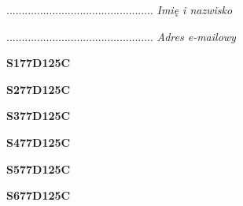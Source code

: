 \begin{turn}{90}\begin{minipage}{\linewidth} \vspace{20mm} ................................................  \textit{Imię i nazwisko}\end{minipage}\end{turn}

\begin{turn}{90}\begin{minipage}{\linewidth} \vspace{20mm} ................................................  \textit{Adres e-mailowy}\end{minipage}\end{turn}

\begin{turn}{90}\huge \begin{minipage}{\linewidth} \vspace{10mm}\textbf{S177D125C}\end{minipage}\end{turn}

\begin{turn}{90}\huge \begin{minipage}{\linewidth} \vspace{10mm}\textbf{S277D125C}\end{minipage}\end{turn}

\begin{turn}{90}\huge \begin{minipage}{\linewidth} \vspace{10mm}\textbf{S377D125C}\end{minipage}\end{turn}

\begin{turn}{90}\huge \begin{minipage}{\linewidth} \vspace{10mm}\textbf{S477D125C}\end{minipage}\end{turn}

\begin{turn}{90}\huge \begin{minipage}{\linewidth} \vspace{10mm}\textbf{S577D125C}\end{minipage}\end{turn}

\begin{turn}{90}\huge \begin{minipage}{\linewidth} \vspace{10mm}\textbf{S677D125C}\end{minipage}\end{turn}

